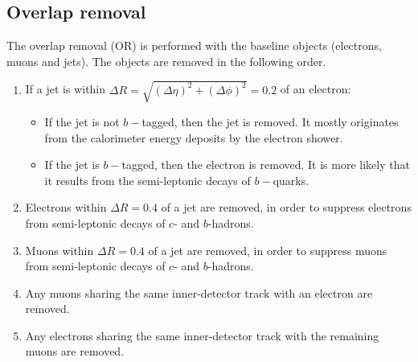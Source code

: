 \subsection{Overlap removal}
\label{sec:overlapRemoval}
The overlap removal (OR) is performed with the baseline objects (electrons, muons and jets).
The objects are removed in the following order.
\begin{enumerate}
\item If a jet is within $\Delta R= \sqrt{(\Delta \eta)^2 + (\Delta \phi)^2}=0.2$ of an electron:
\begin{itemize}
\item If the jet is not $b-$tagged, then the jet is removed. It mostly originates from the calorimeter energy deposits by the electron shower.
\item If the jet is $b-$tagged, then the electron is removed. It is more likely that it results from the semi-leptonic decays of $b-$quarks.
\end{itemize}
\item Electrons within $\Delta R=0.4$ of a jet are removed, in order to suppress electrons from semi-leptonic decays of $c$- and $b$-hadrons.
\item Muons within $\Delta R=0.4$ of a jet are removed, in order to suppress muons from semi-leptonic decays of $c$- and $b$-hadrons.
\item Any muons sharing the same inner-detector track with an electron are removed.
\item Any electrons sharing the same inner-detector track with the remaining muons are removed.
\end{enumerate}
